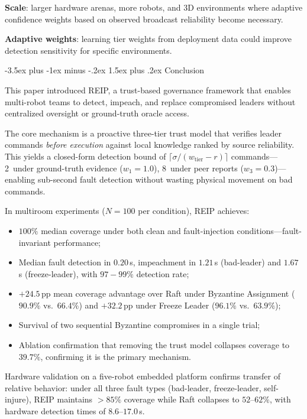 \documentclass[conference]{IEEEtran}
\makeatletter
\renewcommand{\section}{\@startsection{section}{1}{\z@}%
  {-3.5ex plus -1ex minus -.2ex}%
  {1.5ex plus .2ex}%
  {\normalfont\large\bfseries\centering}}
\makeatother
\begin{document}
\textbf{Scale}: larger hardware arenas, more robots, and 3D environments where adaptive confidence weights based on observed broadcast reliability become necessary.

\textbf{Adaptive weights}: learning tier weights from deployment data could improve detection sensitivity for specific environments.

\section{Conclusion}
\label{sec:conclusion}

This paper introduced REIP, a trust-based governance framework that enables multi-robot teams to detect, impeach, and replace compromised leaders without centralized oversight or ground-truth oracle access.

The core mechanism is a proactive three-tier trust model that verifies leader commands \emph{before execution} against local knowledge ranked by source reliability. This yields a closed-form detection bound of $\lceil \sigma / (w_{\text{tier}} - r) \rceil$ commands---2~under ground-truth evidence ($w_1{=}1.0$), 8~under peer reports ($w_3{=}0.3$)---enabling sub-second fault detection without wasting physical movement on bad commands.

In multiroom experiments ($N{=}100$ per condition), REIP achieves:
\begin{itemize}
    \item $100\%$ median coverage under both clean and fault-injection conditions---fault-invariant performance;
    \item Median fault detection in $0.20\,$s, impeachment in $1.21\,$s (bad-leader) and $1.67\,$s (freeze-leader), with $97{-}99\%$ detection rate;
    \item $+24.5\,$pp mean coverage advantage over Raft under Byzantine Assignment ($90.9\%$ vs.\ $66.4\%$) and $+32.2\,$pp under Freeze Leader ($96.1\%$ vs.\ $63.9\%$);
    \item Survival of two sequential Byzantine compromises in a single trial;
    \item Ablation confirmation that removing the trust model collapses coverage to $39.7\%$, confirming it is the primary mechanism.
\end{itemize}

Hardware validation on a five-robot embedded platform confirms transfer of relative behavior: under all three fault types (bad-leader, freeze-leader, self-injure), REIP maintains $>85\%$ coverage while Raft collapses to $52$--$62\%$, with hardware detection times of $8.6$--$17.0\,$s.
\end{document}
